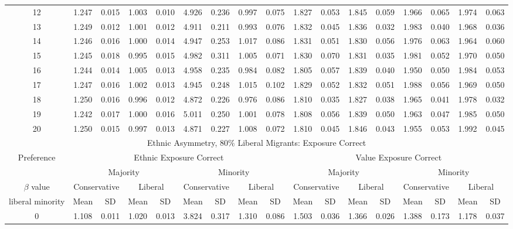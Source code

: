 \documentclass{article}
\begin{document}
\begin{table}[H]
{\begin{tabular}{|c|c|c|c|c|c|c|c|c|c|c|c|c|c|c|c|c|}
    12 & 1.247 & 0.015 & 1.003 & 0.010 & 4.926 & 0.236 & 0.997 & 0.075 & 1.827 & 0.053 & 1.845 & 0.059 & 1.966 & 0.065 & 1.974 & 0.063 \\ 
    13 & 1.249 & 0.012 & 1.001 & 0.012 & 4.911 & 0.211 & 0.993 & 0.076 & 1.832 & 0.045 & 1.836 & 0.032 & 1.983 & 0.040 & 1.968 & 0.036 \\ 
    14 & 1.246 & 0.016 & 1.000 & 0.014 & 4.947 & 0.253 & 1.017 & 0.086 & 1.831 & 0.051 & 1.830 & 0.056 & 1.976 & 0.063 & 1.964 & 0.060 \\ 
    15 & 1.245 & 0.018 & 0.995 & 0.015 & 4.982 & 0.311 & 1.005 & 0.071 & 1.830 & 0.070 & 1.831 & 0.035 & 1.981 & 0.052 & 1.970 & 0.050 \\ 
    16 & 1.244 & 0.014 & 1.005 & 0.013 & 4.958 & 0.235 & 0.984 & 0.082 & 1.805 & 0.057 & 1.839 & 0.040 & 1.950 & 0.050 & 1.984 & 0.053 \\ 
    17 & 1.247 & 0.016 & 1.002 & 0.013 & 4.945 & 0.248 & 1.015 & 0.102 & 1.829 & 0.052 & 1.832 & 0.051 & 1.988 & 0.056 & 1.969 & 0.050 \\ 
    18 & 1.250 & 0.016 & 0.996 & 0.012 & 4.872 & 0.226 & 0.976 & 0.086 & 1.810 & 0.035 & 1.827 & 0.038 & 1.965 & 0.041 & 1.978 & 0.032 \\ 
    19 & 1.242 & 0.017 & 1.000 & 0.016 & 5.011 & 0.250 & 1.001 & 0.078 & 1.808 & 0.056 & 1.839 & 0.050 & 1.963 & 0.047 & 1.985 & 0.050 \\ 
    20 & 1.250 & 0.015 & 0.997 & 0.013 & 4.871 & 0.227 & 1.008 & 0.072 & 1.810 & 0.045 & 1.846 & 0.043 & 1.955 & 0.053 & 1.992 & 0.045 \\ 
   \hline
\multicolumn{17}{|c|}{Ethnic Asymmetry, $80 \%$ Liberal Migrants: Exposure Correct}  \\\hline
 Preference &  \multicolumn{8}{|c|}{Ethnic Exposure Correct} & \multicolumn{8}{|c|}{Value Exposure Correct}   \\\hline
 & \multicolumn{4}{|c|}{Majority} & \multicolumn{4}{|c|}{Minority}  & \multicolumn{4}{|c|}{Majority} & \multicolumn{4}{|c|}{Minority}  \\
 $\beta$ value & \multicolumn{2}{|c|}{Conservative} & \multicolumn{2}{|c|}{Liberal} 
& \multicolumn{2}{|c|}{Conservative} & \multicolumn{2}{|c|}{Liberal} & \multicolumn{2}{|c|}{Conservative} & \multicolumn{2}{|c|}{Liberal} 
& \multicolumn{2}{|c|}{Conservative} & \multicolumn{2}{|c|}{Liberal}\\
 liberal minority & Mean & SD & Mean & SD & Mean & SD & Mean & SD & Mean & SD & Mean & SD & Mean & SD & Mean & SD\\
 \hline
   0 & 1.108 & 0.011 & 1.020 & 0.013 & 3.824 & 0.317 & 1.310 & 0.086 & 1.503 & 0.036 & 1.366 & 0.026 & 1.388 & 0.173 & 1.178 & 0.037 \\ 

\end{tabular}}
\end{table}
\end{document}
